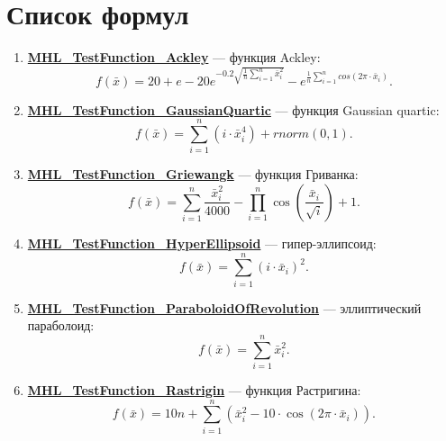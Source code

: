 \section {Список формул}

\begin{enumerate}
 \item \hyperref[TestFunctions:section:MHL_TestFunction_Ackley]{\textbf{MHL\_TestFunction\_Ackley}} --- функция Ackley:
 \begin{equation}
 f\left( \bar{x}\right) = 20 + e - 20e^{-0.2\sqrt{\frac{1}{n}\sum_{i=1}^{n}\bar{x}_i^2}}-e^{\frac{1}{n}\sum_{i=1}^{n}cos\left( 2\pi\cdot\bar{x}_i\right) }.
 \end{equation}
 \item \hyperref[TestFunctions:section:MHL_TestFunction_GaussianQuartic]{\textbf{MHL\_TestFunction\_GaussianQuartic}} --- функция Gaussian quartic:
 \begin{equation}
 f\left( \bar{x}\right) = \sum_{i=1}^{n}\left( i\cdot\bar{x}_i^4\right) +rnorm\left( 0,1\right).
 \end{equation}
 \item \hyperref[TestFunctions:section:MHL_TestFunction_Griewangk]{\textbf{MHL\_TestFunction\_Griewangk}} --- функция Гриванка:
\begin{equation}
f\left( \bar{x}\right) = \sum_{i=1}^{n}\dfrac{\bar{x}_i^2}{4000}-\prod_{i=1}^{n}\cos\left( \dfrac{\bar{x}_i}{\sqrt{i}}\right)+1.
\end{equation} \item \hyperref[TestFunctions:section:MHL_TestFunction_HyperEllipsoid]{\textbf{MHL\_TestFunction\_HyperEllipsoid}} --- гипер-эллипсоид:
\begin{equation}
f\left( \bar{x}\right) = \sum_{i=1}^{n}\left( i\cdot\bar{x}_i\right) ^2.
\end{equation}
 \item \hyperref[TestFunctions:section:MHL_TestFunction_ParaboloidOfRevolution]{\textbf{MHL\_TestFunction\_ParaboloidOfRevolution}} --- эллиптический параболоид:
 \begin{equation}
 f\left( \bar{x}\right) = \sum_{i=1}^{n}\bar{x}_i^2.
 \end{equation}
 \item \hyperref[TestFunctions:section:MHL_TestFunction_Rastrigin]{\textbf{MHL\_TestFunction\_Rastrigin}} --- функция Растригина:
 \begin{equation}
 f\left( \bar{x}\right) = 10n+\sum_{i=1}^{n}\left( \bar{x}_i^2-10\cdot\cos\left( 2\pi\cdot \bar{x}_i\right) \right).
 \end{equation}

\end{enumerate}
